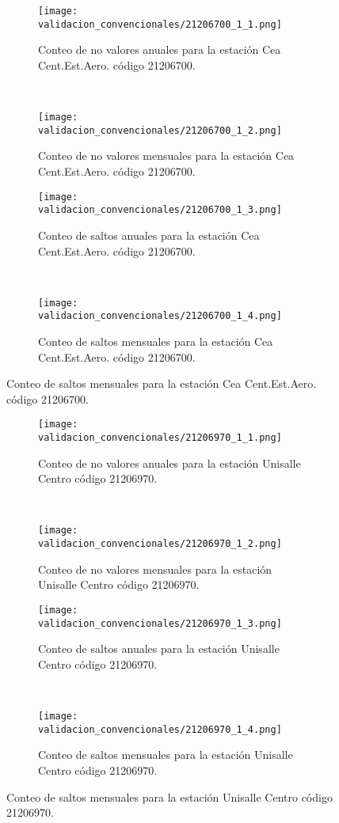 \begin{figure}[H]\ContinuedFloat
\centering
	\begin{subfigure}[normla]{0.4\textwidth}
	\texttt{[image: validacion\_convencionales/21206700\_1\_1.png]}
		\caption{Conteo de no valores anuales para la estación Cea Cent.Est.Aero. código 21206700.}
		\label{subfig:a1}
		\end{subfigure}
		~
    \begin{subfigure}[normla]{0.4\textwidth}
	\texttt{[image: validacion\_convencionales/21206700\_1\_2.png]}
		\caption{Conteo de no valores mensuales para la estación Cea Cent.Est.Aero. código 21206700.}
		\label{subfig:a2}
		\end{subfigure}
		
    \begin{subfigure}[normla]{0.4\textwidth}
	\texttt{[image: validacion\_convencionales/21206700\_1\_3.png]}
		\caption{Conteo de saltos anuales para la estación Cea Cent.Est.Aero. código 21206700.}
		\label{subfig:a1}
		\end{subfigure}
		~
    \begin{subfigure}[normla]{0.4\textwidth}
	\texttt{[image: validacion\_convencionales/21206700\_1\_4.png]}
		\caption{Conteo de saltos mensuales para la estación Cea Cent.Est.Aero. código 21206700.}
		\label{subfig:a2}
		\end{subfigure}

	
\end{figure}
           
\begin{figure}[H]\ContinuedFloat
\centering
	\begin{subfigure}[normla]{0.4\textwidth}
	\texttt{[image: validacion\_convencionales/21206970\_1\_1.png]}
		\caption{Conteo de no valores anuales para la estación Unisalle Centro código 21206970.}
		\label{subfig:a1}
		\end{subfigure}
		~
    \begin{subfigure}[normla]{0.4\textwidth}
	\texttt{[image: validacion\_convencionales/21206970\_1\_2.png]}
		\caption{Conteo de no valores mensuales para la estación Unisalle Centro código 21206970.}
		\label{subfig:a2}
		\end{subfigure}
		
    \begin{subfigure}[normla]{0.4\textwidth}
	\texttt{[image: validacion\_convencionales/21206970\_1\_3.png]}
		\caption{Conteo de saltos anuales para la estación Unisalle Centro código 21206970.}
		\label{subfig:a1}
		\end{subfigure}
		~
    \begin{subfigure}[normla]{0.4\textwidth}
	\texttt{[image: validacion\_convencionales/21206970\_1\_4.png]}
		\caption{Conteo de saltos mensuales para la estación Unisalle Centro código 21206970.}
		\label{subfig:a2}
		\end{subfigure}

	
\end{figure}
           
